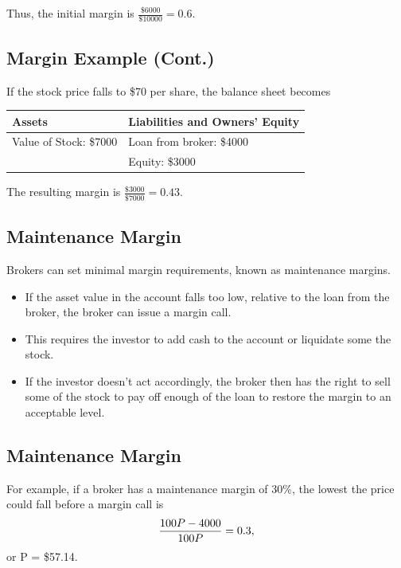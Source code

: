 \documentclass[letterpaper,10pt,english]{sphinxmanual}
\begin{document}
Thus, the initial margin is $\frac{\$6000}{\$10000} = 0.6$.


\subsection{Margin Example (Cont.)}
\label{trading:margin-example-cont}
If the stock price falls to \$70 per share, the balance sheet
becomes

\begin{tabulary}{\linewidth}{|L|L|}
\hline
\textsf{\relax 
Assets
} & \textsf{\relax 
Liabilities and Owners' Equity
}\\
\hline
Value of Stock: \$7000
 & 
Loan from broker: \$4000
\\


 & 
Equity: \$3000
\\
\hline\end{tabulary}


The resulting  margin is $\frac{\$3000}{\$7000} = 0.43$.


\subsection{Maintenance Margin}
\label{trading:maintenance-margin}
Brokers can set minimal margin requirements, known as maintenance
margins.
\begin{itemize}
\item {} 
If the asset value in the account falls too low, relative to
the loan from the broker, the broker can issue a margin call.

\end{itemize}
\begin{itemize}
\item {} 
This requires the investor to add cash to the account or liquidate
some the stock.

\end{itemize}
\begin{itemize}
\item {} 
If the investor doesn't act accordingly, the broker then has
the right to sell some of the stock to pay off enough of the loan
to restore the margin to an acceptable level.

\end{itemize}


\subsection{Maintenance Margin}
\label{trading:id8}
For example, if a broker has a maintenance margin of 30\%, the
lowest the price could fall before a margin call is
\begin{gather}
\begin{split}\frac{100P - 4000}{100P} = 0.3,\end{split}\notag
\end{gather}
or P = \$57.14.
\end{document}

